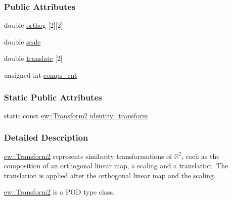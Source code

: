 \subsubsection*{Public Attributes}
\begin{DoxyCompactItemize}
\item 
double \hyperlink{classew_1_1Transform2_a5f6c8c35d5086112e08355556dae6cea}{orthog} \mbox{[}2\mbox{]}\mbox{[}2\mbox{]}
\item 
double \hyperlink{classew_1_1Transform2_a952c5d038168129b6625286f1c93bf07}{scale}
\item 
double \hyperlink{classew_1_1Transform2_ad8c8ca688c6d08508e8ee482606b7184}{translate} \mbox{[}2\mbox{]}
\item 
unsigned int \hyperlink{classew_1_1Transform2_a4fafd08e5f15d46f675237f2ff2adc2c}{comps\_\-cnt}
\end{DoxyCompactItemize}
\subsubsection*{Static Public Attributes}
\begin{DoxyCompactItemize}
\item 
static const \hyperlink{classew_1_1Transform2}{ew::Transform2} \hyperlink{classew_1_1Transform2_adce517699e0386d252283bc37ede5cbf}{identity\_\-transform}
\end{DoxyCompactItemize}


\subsubsection{Detailed Description}
\hyperlink{classew_1_1Transform2}{ew::Transform2} represents similarity transformations of $\mathbb{R}^2$, each as the composition of an orthogonal linear map, a scaling and a translation. The translation is applied after the orthogonal linear map and the scaling.

\hyperlink{classew_1_1Transform2}{ew::Transform2} is a POD type class. 

